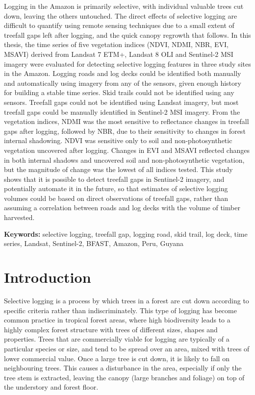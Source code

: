 \documentclass[a4paper,12pt]{scrbook}
\begin{document}
Logging in the Amazon is primarily selective, with individual valuable trees cut down, leaving the others untouched. The direct effects of selective logging are difficult to quantify using remote sensing techniques due to a small extent of treefall gaps left after logging, and the quick canopy regrowth that follows. In this thesis, the time series of five vegetation indices (NDVI, NDMI, NBR, EVI, MSAVI) derived from Landsat 7 ETM+, Landsat 8 OLI and Sentinel-2 MSI imagery were evaluated for detecting selective logging features in three study sites in the Amazon. Logging roads and log decks could be identified both manually and automatically using imagery from any of the sensors, given enough history for building a stable time series. Skid trails could not be identified using any sensors. Treefall gaps could not be identified using Landsat imagery, but most treefall gaps could be manually identified in Sentinel-2 MSI imagery. From the vegetation indices, NDMI was the most sensitive to reflectance changes in treefall gaps after logging, followed by NBR, due to their sensitivity to changes in forest internal shadowing. NDVI was sensitive only to soil and non-photosynthetic vegetation uncovered after logging. Changes in EVI and MSAVI reflected changes in both internal shadows and uncovered soil and non-photosynthetic vegetation, but the magnitude of change was the lowest of all indices tested. This study shows that it is possible to detect treefall gaps in Sentinel-2 imagery, and potentially automate it in the future, so that estimates of selective logging volumes could be based on direct observations of treefall gaps, rather than assuming a correlation between roads and log decks with the volume of timber harvested.

\textbf{Keywords:} selective logging, treefall gap, logging road, skid trail, log deck, time series, Landsat, Sentinel-2, BFAST, Amazon, Peru, Guyana

\tableofcontents

\chapter{Introduction}

Selective logging is a process by which trees in a forest are cut down according to specific criteria rather than indiscriminately. This type of logging has become common practice in tropical forest areas, where high biodiversity leads to a highly complex forest structure with trees of different sizes, shapes and properties. Trees that are commercially viable for logging are typically of a particular species or size, and tend to be spread over an area, mixed with trees of lower commercial value. Once a large tree is cut down, it is likely to fall on neighbouring trees. This causes a disturbance in the area, especially if only the tree stem is extracted, leaving the canopy (large branches and foliage) on top of the understory and forest floor.
\end{document}
